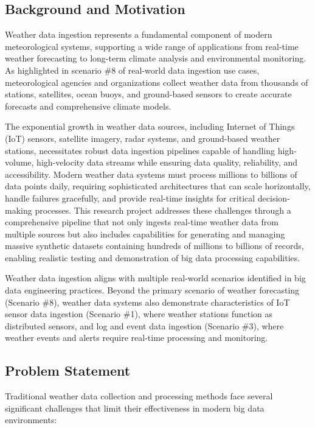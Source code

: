 \documentclass[12pt,a4paper]{article}
\begin{document}
\subsection{Background and Motivation}

Weather data ingestion represents a fundamental component of modern meteorological systems, supporting a wide range of applications from real-time weather forecasting to long-term climate analysis and environmental monitoring. As highlighted in scenario \#8 of real-world data ingestion use cases, meteorological agencies and organizations collect weather data from thousands of stations, satellites, ocean buoys, and ground-based sensors to create accurate forecasts and comprehensive climate models.

The exponential growth in weather data sources, including Internet of Things (IoT) sensors, satellite imagery, radar systems, and ground-based weather stations, necessitates robust data ingestion pipelines capable of handling high-volume, high-velocity data streams while ensuring data quality, reliability, and accessibility. Modern weather data systems must process millions to billions of data points daily, requiring sophisticated architectures that can scale horizontally, handle failures gracefully, and provide real-time insights for critical decision-making processes. This research project addresses these challenges through a comprehensive pipeline that not only ingests real-time weather data from multiple sources but also includes capabilities for generating and managing massive synthetic datasets containing hundreds of millions to billions of records, enabling realistic testing and demonstration of big data processing capabilities.

Weather data ingestion aligns with multiple real-world scenarios identified in big data engineering practices. Beyond the primary scenario of weather forecasting (Scenario \#8), weather data systems also demonstrate characteristics of IoT sensor data ingestion (Scenario \#1), where weather stations function as distributed sensors, and log and event data ingestion (Scenario \#3), where weather events and alerts require real-time processing and monitoring.

\subsection{Problem Statement}

Traditional weather data collection and processing methods face several significant challenges that limit their effectiveness in modern big data environments:
\end{document}
